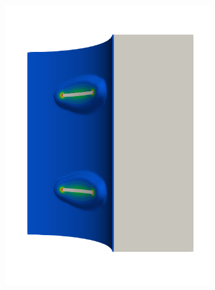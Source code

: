 \begin{frame}
\begin{columns}[T]
\begin{column}{0.6\textwidth}
\begin{figure}
{\begin{subfigure}{0.19\textwidth}
            \includegraphics[width=\textwidth]{Chapter345/figures/seed_ep_3}
          \end{subfigure}
        }
        

\end{figure}
\end{column}
\end{columns}
\end{frame}
